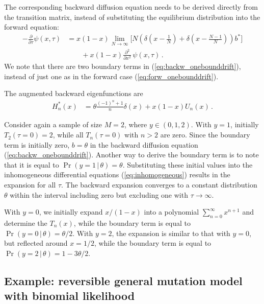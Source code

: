 \documentclass[preprint]{elsarticle}
\newcommand\given{{\,|\,}}
\begin{document}
The corresponding backward diffusion equation needs to be derived directly from the transition matrix, instead of substituting the equilibrium distribution into the forward equation:
\begin{equation}\label{eq:backw_onebounddrift}
\begin{split}
-\frac{\partial}{\partial \tau} \psi(x,\tau)&=
    x(1-x)\lim_{N\to\infty}\bigg[N\left(\delta(x-\tfrac1N)+\delta(x-\tfrac{N-1}N)\right)b^{*}\bigg]\\
    &\qquad+x(1-x)\frac{\partial^2}{\partial x^2}\,\psi(x,\tau)\,.
\end{split}
\end{equation}
We note that there are two boundary terms in (\ref{eq:backw_onebounddrift}), instead of just one as in the forward case (\ref{eq:forw_onebounddrift}). 

The augmented backward eigenfunctions are
\begin{equation}\label{eq:backw_oneboundeigen}
\begin{split}
    H_n^{*}(x)&=\theta\tfrac{(-1)^n+1}{ n}\delta(x)+x(1-x)U_n(x)\,.
\end{split}
\end{equation}

Consider again a sample of size $M=2$, where $y \in (0,1,2)$. With $y=1$, initially $T_2(\tau=0)=2$, while all $T_n(\tau=0)$ with $n>2$ are zero. Since the boundary term is initially zero, $b=\theta$ in the backward diffusion equation (\ref{eq:backw_onebounddrift}). Another way to derive the boundary term is to note that it is equal to $\Pr(y=1\given \theta)=\theta$. Substituting these initial values into the inhomogeneous differential equations (\ref{eq:inhomogeneous}) results in the expansion for all $\tau$. The backward expansion converges to a constant distribution $\theta$ within the interval including zero but excluding one with $\tau\to\infty$.

With $y=0$, we initially expand $x/(1-x)$ into a polynomial $\sum_{n=0}^\infty x^{n+1}$ and determine the $T_n(x)$, while the boundary term is equal to $\Pr(y=0\given \theta)=\theta/2$. With $y=2$, the expansion is similar to that with $y=0$, but reflected around $x=1/2$, while the boundary term is equal to $\Pr(y=2\given \theta)=1-3\theta/2$.

\subsection{Example: reversible general mutation model with binomial likelihood}
\end{document}
